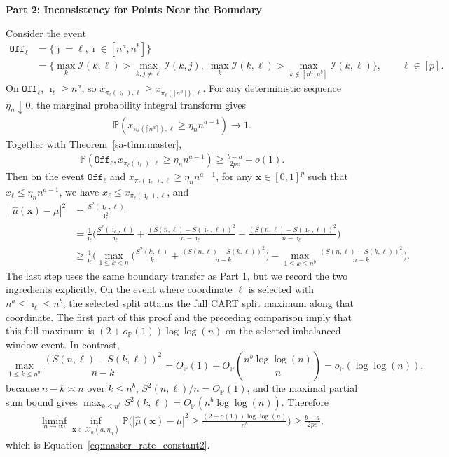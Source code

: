 \documentclass[10pt]{article}
\def\bx{\mathbf{x}}
\def\P{\mathbb{P}}
\def\I{\mathscr{I}}
\theoremstyle{definition}
\theoremstyle{remark}
\begin{document}
\begin{center}
\textbf{Part 2: Inconsistency for Points Near the Boundary}
\end{center}
Consider the event
\begin{align*}
    \mathtt{Off}_{\ell} & = \{\hat{\jmath} = \ell, \hat{\imath} \in [n^a, n^b]\} \\
    & = \{\max_k\I(k,\ell) > \max_{k,j\neq \ell}\I(k,j), \; \max_{k}\I(k,\ell) > \max_{k \notin [n^a, n^b]}\I(k,\ell)\}, \qquad \ell \in [p].
\end{align*}
On $\mathtt{Off}_{\ell}$, $\imath_\ell\geq n^a$, so
$x_{\pi_\ell(\imath_\ell),\ell}\geq x_{\pi_\ell(\lceil n^a\rceil),\ell}$.
For any deterministic sequence $\eta_n\downarrow0$, the marginal probability integral transform gives
\begin{align*}
    \P\!\left(x_{\pi_\ell(\lceil n^a\rceil),\ell} \geq \eta_n n^{a-1}\right) \to 1.
\end{align*}
Together with Theorem~\ref{sa-thm:master},
\begin{align*}
    \P\!\left(\mathtt{Off}_{\ell}, x_{\pi_\ell(\imath_\ell),\ell} \geq \eta_n n^{a-1}\right) \geq \frac{b - a}{2 p e} + o(1).
\end{align*}
Then on the event $\mathtt{Off}_{\ell}$ and $x_{\pi_\ell(\imath_\ell),\ell} \geq \eta_n n^{a-1}$, for any $\bx \in [0,1]^p$ such that $x_{\ell} \leq \eta_n n^{a-1}$, we have $x_{\ell} \leq x_{\pi_\ell(\imath_\ell),\ell}$, and
\begin{align*}
    |\hat\mu(\bx) - \mu|^2 
    & = \frac{S^2(\imath_{\ell},\ell)}{\imath_{\ell}^2} \\
    & = \frac{1}{\imath_{\ell}} \bigg(\frac{S^2(\imath_{\ell},\ell)}{\imath_{\ell}} + \frac{(S(n,\ell) - S(\imath_{\ell},\ell))^2}{n - \imath_{\ell}} - \frac{(S(n,\ell) - S(\imath_{\ell},\ell))^2}{n - \imath_{\ell}}\bigg) \\
    & \geq \frac{1}{\imath_{\ell}} \bigg(\max_{1 \leq k < n}\Big(\frac{S^2(k,\ell)}{k} + \frac{(S(n,\ell) - S(k,\ell))^2}{n - k}\Big) - \max_{1 \leq k \leq n^b} \frac{(S(n, \ell) - S(k,\ell))^2}{n - k}\bigg).
\end{align*}
The last step uses the same boundary transfer as Part 1, but we record the two ingredients explicitly. On the event where coordinate $\ell$ is selected with $n^a\leq\imath_\ell\leq n^b$, the selected split attains the full CART split maximum along that coordinate. The first part of this proof and the preceding comparison imply that this full maximum is $(2+o_\P(1))\log\log(n)$ on the selected imbalanced window event. In contrast,
\[
    \max_{1\leq k\leq n^b}\frac{(S(n,\ell)-S(k,\ell))^2}{n-k}
    =
    O_\P(1)+O_\P\!\left(\frac{n^b\log\log(n)}{n}\right)
    =
    o_\P(\log\log(n)),
\]
because $n-k\asymp n$ over $k\leq n^b$, $S^2(n,\ell)/n=O_\P(1)$, and the maximal partial sum bound gives $\max_{k\leq n^b}S^2(k,\ell)=O_\P(n^b\log\log(n))$. Therefore
\begin{align*}
    \liminf_{n \rightarrow \infty} \inf_{\bx \in \mathcal{X}_n(a,\eta_n)}\P \bigg(|\hat{\mu}(\bx) - \mu|^2 \geq \frac{(2 + o(1))\log \log(n)}{n^b}\bigg) \geq \frac{b - a}{2 p e},
\end{align*}
which is Equation~\eqref{eq:master_rate_constant2}.
\end{document}
